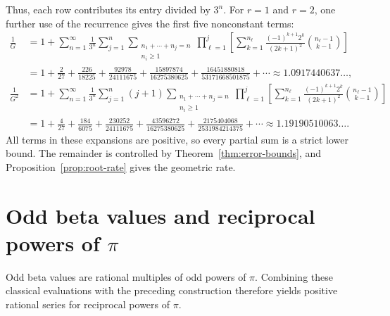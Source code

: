 \documentclass[11pt,reqno]{amsart}
\numberwithin{equation}{section}
\theoremstyle{definition}
\theoremstyle{remark}
\newcommand{\Gconst}{G}
\begin{document}
Thus, each row contributes its entry divided by \(3^n\).  For
\(r=1\) and \(r=2\), one further use of the recurrence gives the first
five nonconstant terms:
\begin{align*}
 \frac1{\Gconst}
 &=
 1+\sum_{n=1}^{\infty}\frac1{3^n}
 \sum_{j=1}^{n}
 \sum_{\substack{n_1+\cdots+n_j=n\\n_i\geq1}}
 \prod_{\ell=1}^{j}
 \left[
 \sum_{k=1}^{n_\ell}
 \frac{(-1)^{k+1}2^k}{(2k+1)^2}
 \binom{n_\ell-1}{k-1}
 \right]\\
 &=
 1+\frac2{27}
 +\frac{226}{18225}
 +\frac{92978}{24111675}
 +\frac{15897874}{16275380625}
 +\frac{16451880818}{53171668501875}
 +\cdots
 \approx 1.0917440637\ldots,\\
 \frac1{\Gconst^2}
 &=
 1+\sum_{n=1}^{\infty}\frac1{3^n}
 \sum_{j=1}^{n}(j+1)
 \sum_{\substack{n_1+\cdots+n_j=n\\n_i\geq1}}
 \prod_{\ell=1}^{j}
 \left[
 \sum_{k=1}^{n_\ell}
 \frac{(-1)^{k+1}2^k}{(2k+1)^2}
 \binom{n_\ell-1}{k-1}
 \right]\\
 &=
 1+\frac4{27}
 +\frac{184}{6075}
 +\frac{230252}{24111675}
 +\frac{43596272}{16275380625}
 +\frac{2175404068}{2531984214375}
 +\cdots
 \approx 1.19190510063\ldots.
\end{align*}
All terms in these expansions are positive, so every partial sum is a
strict lower bound.  The remainder is controlled by
Theorem~\ref{thm:error-bounds}, and Proposition~\ref{prop:root-rate}
gives the geometric rate.
\section{\texorpdfstring{Odd beta values and reciprocal powers of \(\pi\)}
{Odd beta values and reciprocal powers of pi}}
\label{sec:odd-beta}

Odd beta values are rational multiples of odd powers of \(\pi\).
Combining these classical evaluations with the preceding construction
therefore yields positive rational series for reciprocal powers of
\(\pi\).
\end{document}
